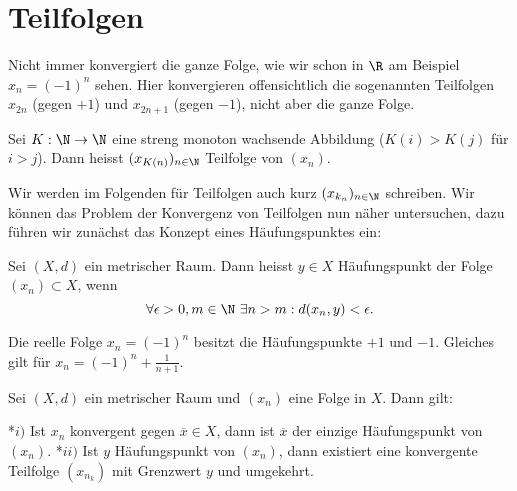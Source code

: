 \documentclass[letterpaper,10pt,english]{jupyterBook}
\begin{document}
\section{Teilfolgen}
\label{\detokenize{metrik/teilfolgen:teilfolgen}}\label{\detokenize{metrik/teilfolgen::doc}}
Nicht immer konvergiert die ganze Folge, wie wir schon in \(\R\) am Beispiel \(x_n = (-1)^n\) sehen. Hier konvergieren offensichtlich die sogenannten Teilfolgen \(x_{2n}\) (gegen \(+1\)) und \(x_{2n+1}\) (gegen \(-1\)), nicht aber die ganze Folge.
\label{metrik/teilfolgen:definition-0}
\begin{definition}{}{}



Sei \(K: \N \rightarrow \N\) eine streng monoton wachsende Abbildung (\(K(i) > K(j)\) für \(i > j\)). Dann heisst \((x_{K(n)})_{n \in \N}\) Teilfolge von \((x_n). \)
\end{definition}

Wir werden im Folgenden für Teilfolgen auch kurz \((x_{k_n})_{n \in \N}\) schreiben.
Wir können das Problem der Konvergenz von Teilfolgen nun näher untersuchen, dazu führen wir zunächst das Konzept eines Häufungspunktes ein:
\label{metrik/teilfolgen:definition-1}
\begin{definition}{}{}



Sei \((X,d)\) ein metrischer Raum. Dann heisst \(y \in X\) Häufungspunkt der Folge \((x_n) \subset X\), wenn
\begin{equation*}
 \forall \epsilon > 0, m \in \N ~\exists n > m: d(x_n,y) < \epsilon.
\end{equation*}\end{definition}
\label{metrik/teilfolgen:example-2}
\begin{example}{}{}



Die reelle Folge \(x_n = (-1)^n\) besitzt die Häufungspunkte \(+1\) und \(-1\). Gleiches gilt für \(x_n = (-1)^n + \frac{1}{n+1}\).
\end{example}
\label{metrik/teilfolgen:theorem-3}
\begin{theorem}{}{}



Sei \((X,d)\) ein metrischer Raum und \((x_n)\) eine Folge in \(X\). Dann gilt:

*\(i)\) Ist \(x_n\) konvergent gegen \(\overline{x} \in X\), dann ist \(\overline{x}\) der einzige Häufungspunkt von \((x_n)\).
*\(ii)\) Ist \(y\) Häufungspunkt von \((x_n)\), dann existiert eine konvergente Teilfolge \((x_{n_k})\) mit Grenzwert \(y\) und umgekehrt.
\end{theorem}
\end{document}

